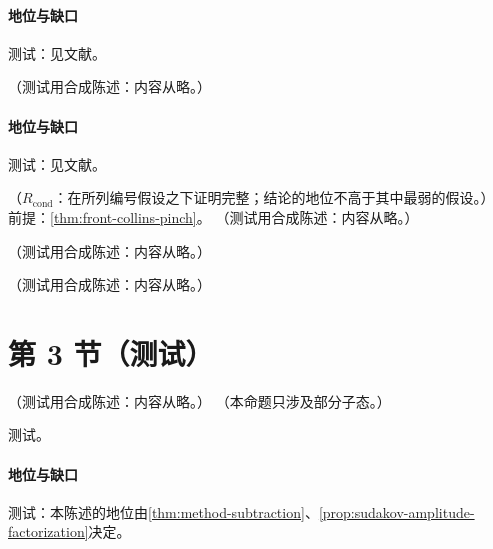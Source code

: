 \paragraph{地位与缺口}测试：见文献。

\begin{proposition}\label{prop:front-landau-not-singular}
（测试用合成陈述：内容从略。）
\end{proposition}
\paragraph{地位与缺口}测试：见文献。

\begin{corollary}\label{cor:front-coleman-norton}
（$R_{\mathrm{cond}}$：在所列编号假设之下证明完整；结论的地位不高于其中最弱的假设。）
前提：\cref{thm:front-collins-pinch}。
（测试用合成陈述：内容从略。）
\end{corollary}

\begin{example}[无质量自能的共线钳夹]\label{ex:front-collinear-pinch}
（测试用合成陈述：内容从略。）
\end{example}

\begin{remark}\label{rem:front-cn-history}
（测试用合成陈述：内容从略。）
\end{remark}

\section{第 3 节（测试）}\label{sec:front-ope}

\begin{proposition}\label{prop:front-ir-forest}
（测试用合成陈述：内容从略。）
（本命题只涉及部分子态。）
\end{proposition}
\begin{proofsketch}测试。\end{proofsketch}
\paragraph{地位与缺口}测试：本陈述的地位由\cref{thm:method-subtraction}、\cref{prop:sudakov-amplitude-factorization}决定。

